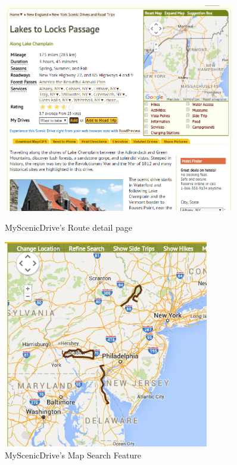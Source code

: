 \documentclass[a4paper,twoside,notitlepage,11pt]{article}
\begin{document}
\begin{figure}[!ht]
\centering
	\begin{minipage}{.49\textwidth}
		\begin{center}
			\includegraphics[width=0.9\textwidth]{images/msd-1.png}
			\caption{MyScenicDrive's Route detail page}
		\end{center}
	\end{minipage}
	\begin{minipage}{.49\textwidth}
		\begin{center}
			\includegraphics[width=0.8\textwidth]{images/msd-2.png}
			\caption{MyScenicDrive's Map Search Feature}
		\end{center}
	\end{minipage}
	\vspace{-10mm}
\end{figure}
\end{document}
